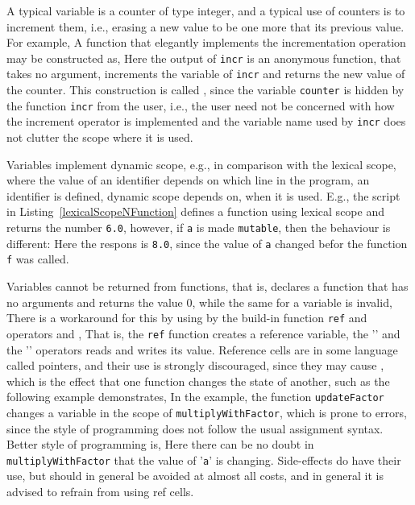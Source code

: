A typical variable is a counter of type integer, and a typical use of counters is to increment them, i.e., erasing a new value to be one more that its previous value. For example,
%
%
A function that elegantly implements the incrementation operation may be constructed as,
%
%
 Here the output of \texttt{incr} is an anonymous function, that takes no argument, increments the variable of \texttt{incr} and returns the new value of the counter. This construction is called , since the variable \texttt{counter} is hidden by the function \texttt{incr} from the user, i.e., the user need not be concerned with how the increment operator is implemented and the variable name used by \texttt{incr} does not clutter the scope where it is used.

Variables implement dynamic scope, e.g., in comparison with the lexical scope, where the value of an identifier depends on which line in the program, an identifier is defined, dynamic scope depends on, when it is used. E.g., the script in Listing~\ref{lexicalScopeNFunction} defines a function using lexical scope and returns the number \lstinline!6.0!, however, if \lstinline!a! is made \lstinline!mutable!, then the behaviour is different:
%
%
Here the respons is \lstinline!8.0!, since the value of \lstinline!a! changed befor the function \lstinline!f! was called.
 
Variables cannot be returned from functions, that is,
%
%
declares a function that has no arguments and returns the value 0, while the same for a variable is invalid,
%
%
There is a workaround for this by using  by the build-in function \texttt{ref} and operators \lexeme{!} and \lexeme{:=},
%
%
That is, the \texttt{ref} function creates a reference variable, the '\lexeme{!}' and the '\lexeme{:=}' operators reads and writes its value. Reference cells are in some language called pointers, and their use is strongly discouraged, since they may cause , which is the effect that one function changes the state of another, such as the following example demonstrates,
%
%
In the example, the function \texttt{updateFactor} changes a variable in the scope of \texttt{multiplyWithFactor}, which is prone to errors, since the style of programming does not follow the usual assignment syntax. Better style of programming is,
%
%
Here there can be no doubt in \texttt{multiplyWithFactor} that the value of '\texttt{a}' is changing. Side-effects do have their use, but should in general be avoided at almost all costs, and in general it is advised to refrain from using ref cells.


